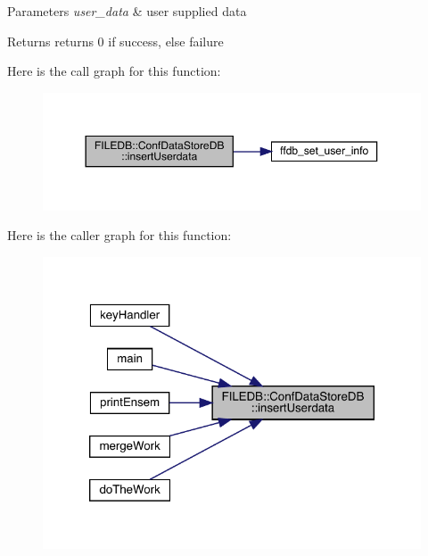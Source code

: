 \begin{DoxyParams}{Parameters}
{\em user\+\_\+data} & user supplied data \\
\hline
\end{DoxyParams}
\begin{DoxyReturn}{Returns}
returns 0 if success, else failure 
\end{DoxyReturn}
Here is the call graph for this function\+:
\nopagebreak
\begin{figure}[H]
\begin{center}
\leavevmode
\includegraphics[width=350pt]{d8/d19/classFILEDB_1_1ConfDataStoreDB_a8fa05198f3ff1f405fbdfc6a51f43d1a_cgraph}
\end{center}
\end{figure}
Here is the caller graph for this function\+:\nopagebreak
\begin{figure}[H]
\begin{center}
\leavevmode
\includegraphics[width=320pt]{d8/d19/classFILEDB_1_1ConfDataStoreDB_a8fa05198f3ff1f405fbdfc6a51f43d1a_icgraph}
\end{center}
\end{figure}
\mbox{\label{classFILEDB_1_1ConfDataStoreDB_a8fa05198f3ff1f405fbdfc6a51f43d1a}} 
